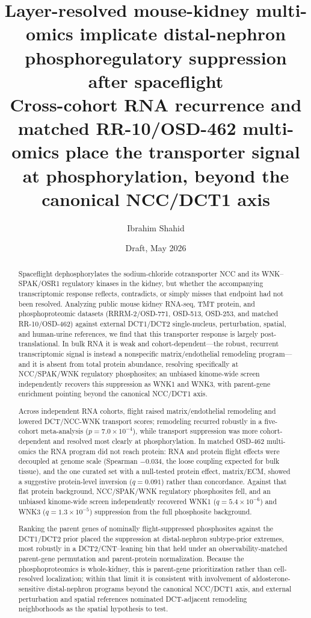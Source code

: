 \documentclass[11pt]{article}
\title{\textbf{Layer-resolved mouse-kidney multi-omics implicate distal-nephron phosphoregulatory suppression after spaceflight}\\[0.35em]
\large Cross-cohort RNA recurrence and matched RR-10/OSD-462 multi-omics place the transporter signal at phosphorylation, beyond the canonical NCC/DCT1 axis}
\author{Ibrahim Shahid}
\affil{Independent research manuscript}
\date{Draft, May 2026}
\begin{document}
\maketitle

\begin{abstract}
\noindent
Spaceflight dephosphorylates the sodium-chloride cotransporter NCC and its WNK--SPAK/OSR1 regulatory kinases in the kidney, but whether the accompanying transcriptomic response reflects, contradicts, or simply misses that endpoint had not been resolved. Analyzing public mouse kidney RNA-seq, TMT protein, and phosphoproteomic datasets (RRRM-2/OSD-771, OSD-513, OSD-253, and matched RR-10/OSD-462) against external DCT1/DCT2 single-nucleus, perturbation, spatial, and human-urine references, we find that this transporter response is largely post-translational. In bulk RNA it is weak and cohort-dependent---the robust, recurrent transcriptomic signal is instead a nonspecific matrix/endothelial remodeling program---and it is absent from total protein abundance, resolving specifically at NCC/SPAK/WNK regulatory phosphosites; an unbiased kinome-wide screen independently recovers this suppression as WNK1 and WNK3, with parent-gene enrichment pointing beyond the canonical NCC/DCT1 axis.

Across independent RNA cohorts, flight raised matrix/endothelial remodeling and lowered DCT/NCC-WNK transport scores; remodeling recurred robustly in a five-cohort meta-analysis ($p=7.0\times10^{-4}$), while transport suppression was more cohort-dependent and resolved most clearly at phosphorylation. In matched OSD-462 multi-omics the RNA program did not reach protein: RNA and protein flight effects were decoupled at genome scale (Spearman $-0.034$, the loose coupling expected for bulk tissue), and the one curated set with a null-tested protein effect, matrix/ECM, showed a suggestive protein-level inversion ($q=0.091$) rather than concordance. Against that flat protein background, NCC/SPAK/WNK regulatory phosphosites fell, and an unbiased kinome-wide screen independently recovered WNK1 ($q=5.4\times10^{-6}$) and WNK3 ($q=1.3\times10^{-5}$) suppression from the full phosphosite background.

Ranking the parent genes of nominally flight-suppressed phosphosites against the DCT1/DCT2 prior placed the suppression at distal-nephron subtype-prior extremes, most robustly in a DCT2/CNT--leaning bin that held under an observability-matched parent-gene permutation and parent-protein normalization. Because the phosphoproteomics is whole-kidney, this is parent-gene prioritization rather than cell-resolved localization; within that limit it is consistent with involvement of aldosterone-sensitive distal-nephron programs beyond the canonical NCC/DCT1 axis, and external perturbation and spatial references nominated DCT-adjacent remodeling neighborhoods as the spatial hypothesis to test.


\end{abstract}
\end{document}

